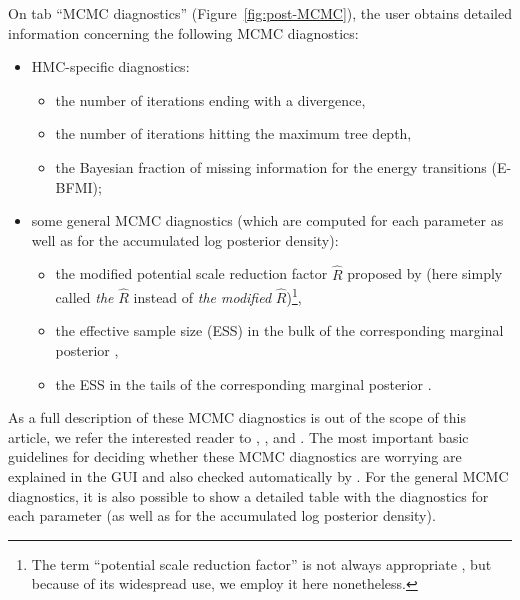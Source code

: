 On tab ``MCMC diagnostics'' (Figure~\ref{fig:post-MCMC}), the user
obtains detailed information concerning the following MCMC diagnostics:
\begin{itemize}
  \item HMC-specific diagnostics:
  \begin{itemize}
    \item the number of iterations ending with a divergence,

    \item the number of iterations hitting the maximum tree depth,

    \item the Bayesian fraction of missing information for the energy
    transitions (E-BFMI);
  \end{itemize}

  \item some general MCMC diagnostics (which are computed for each parameter as
  well as for the accumulated log posterior density):
  \begin{itemize}
    \item the modified potential scale reduction factor $\widehat{R}$ proposed
    by \citet{vehtari_rank-normalization_2021} (here simply called \emph{the}
    $\widehat{R}$ instead of \emph{the modified} $\widehat{R}$)\footnote{The
    term ``potential scale reduction factor'' is not always appropriate
    \citep[section~2]{vehtari_rank-normalization_2021}, but because of its
    widespread use, we employ it here nonetheless.},

    \item the effective sample size (ESS) in the bulk of the corresponding
    marginal posterior \citep{vehtari_rank-normalization_2021},

    \item the ESS in the tails of the corresponding marginal posterior
    \citep{vehtari_rank-normalization_2021}.
  \end{itemize}
\end{itemize}
As a full description of these MCMC diagnostics is out of the scope of this
article, we refer the interested reader to \citet{stan_development_team_runtime_2022},
\citet{betancourt_conceptual_2018}, and
\citet{vehtari_rank-normalization_2021}. The most important basic guidelines
for deciding whether these MCMC diagnostics are worrying are explained in the
 GUI and also checked automatically by . For the
general MCMC diagnostics, it is also possible to show a detailed table with
the diagnostics for each parameter (as well as for the accumulated
log posterior density).


